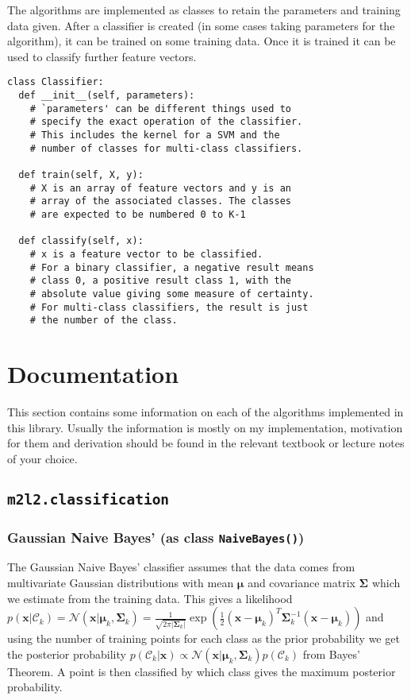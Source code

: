 \documentclass[a4paper, 12pt]{article}
\begin{document}
The algorithms are implemented as classes to retain the parameters and training data given. After a classifier is created (in some cases taking parameters for the algorithm), it can be trained on some training data. Once it is trained it can be used to classify further feature vectors.

\begin{lstlisting}[frame=TLbr,breaklines=true]
class Classifier:
  def __init__(self, parameters):
    # `parameters' can be different things used to
    # specify the exact operation of the classifier.
    # This includes the kernel for a SVM and the
    # number of classes for multi-class classifiers.
  
  def train(self, X, y):
    # X is an array of feature vectors and y is an
    # array of the associated classes. The classes
    # are expected to be numbered 0 to K-1
  
  def classify(self, x):
    # x is a feature vector to be classified.
    # For a binary classifier, a negative result means
    # class 0, a positive result class 1, with the
    # absolute value giving some measure of certainty.
    # For multi-class classifiers, the result is just
    # the number of the class.
\end{lstlisting}


\section{Documentation}
This section contains some information on each of the algorithms implemented in this library. Usually the information is mostly on my implementation, motivation for them and derivation should be found in the relevant textbook or lecture notes of your choice.

\subsection{\texttt{m2l2.classification}}
\subsubsection{Gaussian Naive Bayes' (as class \texttt{NaiveBayes()})}
The Gaussian Naive Bayes' classifier assumes that the data comes from multivariate Gaussian distributions with mean $\bm{\mu}$ and covariance matrix $\bm{\Sigma}$ which we estimate from the training data. This gives a likelihood $p(\mathbf{x} | \mathcal{C}_k) = \mathcal{N}(\mathbf{x} | \bm{\mu}_k, \bm{\Sigma}_k) = \frac{1}{\sqrt{2 \pi |\bm{\Sigma}_k|}} \exp\left(\frac{1}{2} (\mathbf{x} - \bm{\mu}_k)^T\bm{\Sigma}_k^{-1}(\mathbf{x} - \bm{\mu}_k)\right)$ and using the number of training points for each class as the prior probability we get the posterior probability $p(\mathcal{C}_k | \mathbf{x}) \propto \mathcal{N}(\mathbf{x} | \bm{\mu}_k, \bm{\Sigma}_k) p(\mathcal{C}_k)$ from Bayes' Theorem. A point is then classified by which class gives the maximum posterior probability.
\end{document}
